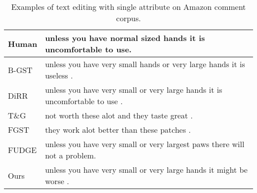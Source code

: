 \documentclass[11pt]{article}
\begin{document}
\begin{table}[ht]
\begin{tabular}{ll}
Human&unless you have normal sized hands it is uncomfortable to use.\\
\midrule
B-GST&unless you have very small hands or very large hands it is useless .\\
DiRR&unless you have very small or very large hands it is uncomfortable to use .\\
T\&G&not worth these alot and they taste great .\\
FGST&they work alot better than these patches .\\\midrule
FUDGE&unless you have very small or very largest paws there will not a problem.\\
Ours&unless you have very small or very large hands it might be worse .\\
\bottomrule
    \end{tabular}
    \caption{Examples of text editing with single attribute on Amazon comment corpus.}
    \label{tab:example_tst_amazon}
\end{table}
\end{document}
